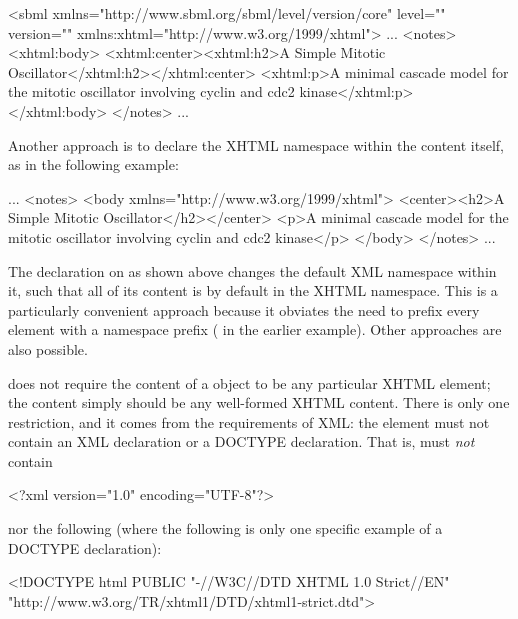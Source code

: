 \begin{example}
<sbml xmlns="http://www.sbml.org/sbml/level\sbmllevel/version\sbmlversionnum/core" level="\sbmllevel" version="\sbmlversionnum"
      xmlns:xhtml="http://www.w3.org/1999/xhtml">
  ...
  <notes>
    <xhtml:body>
      <xhtml:center><xhtml:h2>A Simple Mitotic Oscillator</xhtml:h2></xhtml:center>
      <xhtml:p>A minimal cascade model for the mitotic oscillator
      involving cyclin and cdc2 kinase</xhtml:p>
    </xhtml:body>
  </notes>
  ...
\end{example}

Another approach is to declare the XHTML namespace within the
 content itself, as in the following example:

\begin{example}
...
<notes>
  <body xmlns="http://www.w3.org/1999/xhtml">
    <center><h2>A Simple Mitotic Oscillator</h2></center>
    <p>A minimal cascade model for the mitotic oscillator involving cyclin and cdc2 kinase</p>
  </body>
</notes>
...
\end{example}

The  declaration on
 as shown above changes the default XML namespace
within it, such that all of its content is by default in the XHTML
namespace.  This is a particularly convenient approach because it
obviates the need to prefix every element with a namespace prefix
(\ie {} in the earlier example).  Other
approaches are also possible.



\sbmlthree does not require the content of a \Notes object to be
any particular XHTML element; the content simply should be any
well-formed XHTML content.  There is only one restriction, and it
comes from the requirements of XML: the  element must
not contain an XML declaration or a DOCTYPE declaration.  That
is,  must \emph{not} contain

\begin{example}
<?xml version="1.0" encoding="UTF-8"?>  
\end{example}

nor the following (where the following is only one specific
example of a DOCTYPE declaration):

\begin{example}
<!DOCTYPE html PUBLIC "-//W3C//DTD XHTML 1.0 Strict//EN"
 "http://www.w3.org/TR/xhtml1/DTD/xhtml1-strict.dtd">
\end{example}


